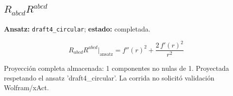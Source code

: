 \documentclass[11pt]{article}
\begin{document}
\subsection*{$ R_{abcd}R^{abcd} $}
\textbf{Ansatz:} \texttt{draft4\_circular}; \textbf{estado:} completada.\par
\begin{dmath*}[breakdepth={5}]
R_{abcd}R^{abcd}\big|_{\mathrm{ansatz}} = {f''\!\left(r\right)}^{2} + \frac{2\,{f'\!\left(r\right)}^{2}}{{r}^{2}}
\end{dmath*}
\par\smallskip
Proyección completa almacenada: 1 componentes no nulas de 1. Proyectada respetando el ansatz 'draft4\_circular'. La corrida no solicitó validación Wolfram/xAct.\par\medskip
{}
\end{document}
